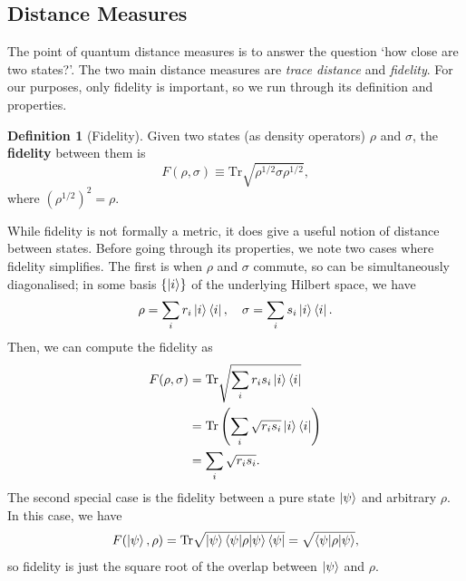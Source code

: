 \documentclass[12pt,a4paper]{report}
\numberwithin{equation}{section}
\newcommand{\ketbra}[2]{\ket{#1}\bra{#2}}
\newcommand{\ketbras}[1]{\ketbra{#1}{#1}}
\newcommand{\tr}{\text{Tr}}
\theoremstyle{definition}
\newtheorem{definition}{Definition}[section]
\theoremstyle{theorem}
\theoremstyle{theorem}
\theoremstyle{example}
\theoremstyle{definition}
\begin{document}
\subsection{Distance Measures}
The point of quantum distance measures is to answer the question `how close are two states?'. The two main distance measures are \textit{trace distance} and \textit{fidelity}. For our purposes, only fidelity is important, so we run through its definition and properties.
\begin{definition}[Fidelity]
	Given two states (as density operators) $\rho$ and $\sigma$, the \textbf{fidelity} between them is
	\begin{equation}
		F(\rho,\sigma)\equiv\tr\sqrt{\rho^{1/2}\sigma\rho^{1/2}},
	\end{equation}
	where $(\rho^{1/2})^{2}=\rho$.
\end{definition}
While fidelity is not formally a metric, it does give a useful notion of distance between states. Before going through its properties, we note two cases where fidelity simplifies. The first is when $\rho$ and $\sigma$ commute, so can be simultaneously diagonalised; in some basis $\{\ket{i}\}$ of the underlying Hilbert space, we have
\begin{equation}
	\rho=\sum_{i}r_{i}\ketbras{i},\quad\sigma=\sum_{i}s_{i}\ketbras{i}.
\end{equation}
Then, we can compute the fidelity as
\begin{equation}
	\begin{aligned}
		F(\rho,\sigma)&=\tr\sqrt{\sum_{i}r_{i}s_{i}\ketbras{i}}\\&=\tr\left(\sum_{i}\sqrt{r_{i}s_{i}}\ketbras{i}\right)\\&=\sum_{i}\sqrt{r_{i}s_{i}}.
	\end{aligned}
\end{equation}
The second special case is the fidelity between a pure state $\ket{\psi}$ and arbitrary $\rho$. In this case, we have
\begin{equation}
	F(\ket{\psi},\rho)=\tr\sqrt{\ket{\psi}\braket{\psi|\rho|\psi}\bra{\psi}}=\sqrt{\braket{\psi|\rho|\psi}},
\end{equation}
so fidelity is just the square root of the overlap between $\ket{\psi}$ and $\rho$.
\end{document}
